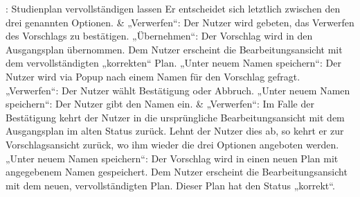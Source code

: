 \begin{usecase}{: Studienplan vervollständigen lassen}
	Er entscheidet sich letztlich zwischen den drei genannten Optionen. 
	& „Verwerfen“: Der Nutzer wird gebeten, das Verwerfen des Vorschlags zu bestätigen. \newline
	„Übernehmen“: Der Vorschlag wird in den Ausgangsplan übernommen. Dem Nutzer erscheint die Bearbeitungsansicht mit dem vervollständigten „korrekten“ Plan. \newline
	„Unter neuem Namen speichern“:  Der Nutzer wird via Popup nach einem Namen für den Vorschlag gefragt. \\
	\hline
	„Verwerfen“: Der Nutzer wählt Bestätigung oder Abbruch. \newline
	„Unter neuem Namen speichern“: Der Nutzer gibt den Namen ein. 
	& „Verwerfen“: Im Falle der Bestätigung kehrt der Nutzer in die ursprüngliche Bearbeitungsansicht mit dem Ausgangsplan im alten Status zurück. Lehnt der Nutzer dies ab, so kehrt er zur Vorschlagsansicht zurück, wo ihm wieder die drei Optionen angeboten werden. \newline
	„Unter neuem Namen speichern“: Der Vorschlag wird in einen neuen Plan mit angegebenem Namen gespeichert. Dem Nutzer erscheint die Bearbeitungsansicht mit dem neuen, vervollständigten Plan. Dieser Plan hat den Status „korrekt“.
\end{usecase}


\bigskip

\renewcommand{\arraystretch}{1.0}
\setlength{\LTpre}{\bigskipamount}
\setlength{\LTpost}{\bigskipamount}